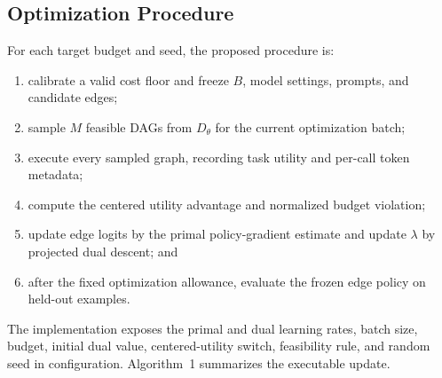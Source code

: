 \subsection{Optimization Procedure}

For each target budget and seed, the proposed procedure is:
\begin{enumerate}
    \item calibrate a valid cost floor and freeze $B$, model settings, prompts, and candidate edges;
    \item sample $M$ feasible DAGs from $D_{\theta}$ for the current optimization batch;
    \item execute every sampled graph, recording task utility and per-call token metadata;
    \item compute the centered utility advantage and normalized budget violation;
    \item update edge logits by the primal policy-gradient estimate and update $\lambda$ by projected dual descent; and
    \item after the fixed optimization allowance, evaluate the frozen edge policy on held-out examples.
\end{enumerate}
The implementation exposes the primal and dual learning rates, batch size, budget, initial dual value, centered-utility switch, feasibility rule, and random seed in configuration. Algorithm~1 summarizes the executable update.

\begin{center}
\end{center}

